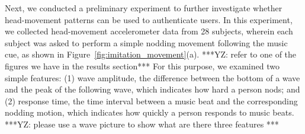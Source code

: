 Next, we conducted a preliminary experiment to further investigate whether head-movement patterns can be used to authenticate users. In this experiment, we collected head-movement accelerometer data from 28 subjects, wherein each subject was asked to perform a simple nodding movement following the music cue, as shown in Figure~\ref{fig:imitation_movement}(a). ***YZ: refer to one of the figures we have in the results section***  For this purpose, we examined two simple features: (1) wave amplitude, the difference between the bottom of a wave and the peak of the following wave, which indicates how hard a person nods; %
and (2) response time, the time interval between a music beat and the corresponding nodding motion, which indicates how quickly a person responds to music beats. ***YZ: please use a wave picture to show what are there three features ***
